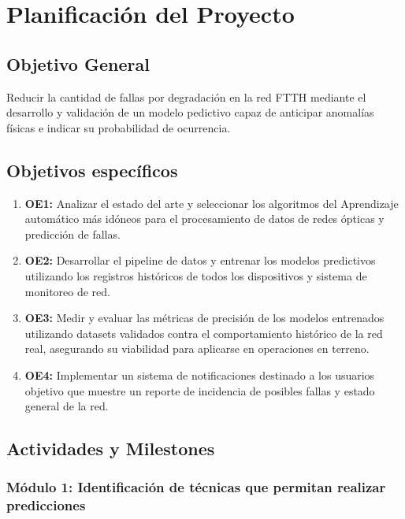 \documentclass[12pt,a4paper]{article}
\begin{document}
    \section{Planificación del Proyecto}
    \subsection{Objetivo General}
    \noindent
    Reducir la cantidad de fallas por degradación en la red FTTH mediante el desarrollo y validación de un modelo pedictivo capaz de anticipar anomalías físicas e indicar su probabilidad de ocurrencia.

    \subsection{Objetivos específicos}
    \begin{enumerate}
        \item \textbf{OE1:} Analizar el estado del arte y seleccionar los algoritmos del Aprendizaje automático más idóneos para el procesamiento de datos de redes ópticas y predicción de fallas.
        \item \textbf{OE2:} Desarrollar el pipeline de datos y entrenar los modelos predictivos utilizando los registros históricos de todos los dispositivos y sistema de monitoreo de red.
        \item \textbf{OE3:} Medir y evaluar las métricas de precisión de los modelos entrenados utilizando datasets validados contra el comportamiento histórico de la red real, asegurando su viabilidad para aplicarse en operaciones en terreno.
        \item \textbf{OE4:} Implementar un sistema de notificaciones destinado a los usuarios objetivo que muestre un reporte de incidencia de posibles fallas y estado general de la red.
    \end{enumerate}

    \subsection{Actividades y Milestones}
    \noindent
    

    \subsubsection{Módulo 1: Identificación de técnicas que permitan realizar predicciones}
\end{document}
